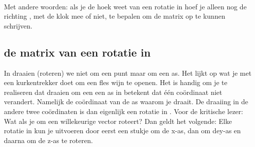 
\\
Met andere woorden: als je de hoek weet van een rotatie in \RT hoef je alleen nog de richting , met de klok mee of niet,  te bepalen om de matrix op te kunnen schrijven.

\subsection{de matrix van een rotatie in \RD}
In \RD draaien (roteren) we niet om een punt maar om een as. Het lijkt op wat je met een kurkentrekker doet om een fles wijn te openen. Het is handig om je te realiseren dat draaien om een een as in \RD betekent dat één coördinaat niet verandert. Namelijk de coördinaat van de as waarom je draait.  De draaiing in de andere twee coördinaten is dan eigenlijk een rotatie in \RT. Voor de kritische lezer: Wat als je  om een willekeurige vector roteert? Dan geldt het volgende: Elke rotatie in \RD kun je uitvoeren door eerst een stukje om de x-as, dan om dey-as en daarna om de z-as te roteren.




